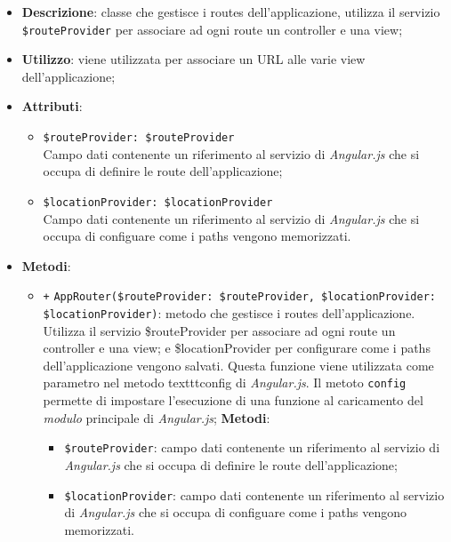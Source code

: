 	\begin{itemize}
		\item \textbf{Descrizione}: classe che gestisce i routes dell’applicazione, utilizza il servizio \texttt{\$routeProvider} per associare ad ogni route un controller e una view;
		\item \textbf{Utilizzo}: viene utilizzata per associare un URL alle varie view dell’applicazione;
		\item \textbf{Attributi}:
		\begin{itemize}
			\item \texttt{\$routeProvider: \$routeProvider}\\ Campo dati contenente un riferimento al servizio di \textit{Angular.js} che si occupa di definire le route dell’applicazione;
			\item \texttt{\$locationProvider: \$locationProvider}\\ Campo dati contenente un riferimento al servizio di \textit{Angular.js} che si occupa di configuare come i paths vengono memorizzati.
		\end{itemize}
		\item \textbf{Metodi}: 
		\begin{itemize}
			\item \texttt{+} \texttt{AppRouter(\$routeProvider: \$routeProvider, \$locationProvider: \$locationProvider)}: metodo che gestisce i routes dell’applicazione. Utilizza il servizio \$routeProvider per associare ad ogni route un controller e una view; e \$locationProvider per configurare come i paths dell'applicazione vengono salvati. Questa funzione viene utilizzata come parametro nel metodo texttt{config} di \textit{Angular.js}. Il metoto \texttt{config} permette di impostare l'esecuzione di una funzione al caricamento del \textit{modulo} principale di \textit{Angular.js};
			\textbf{Metodi}:
			\begin{itemize}
				\item \texttt{\$routeProvider}: campo dati contenente un riferimento al servizio di \textit{Angular.js} che si occupa di definire le route dell’applicazione;
				\item \texttt{\$locationProvider}: campo dati contenente un riferimento al servizio di \textit{Angular.js} che si occupa di configuare come i paths vengono memorizzati.
			\end{itemize}
		\end{itemize}
	\end{itemize}
	
